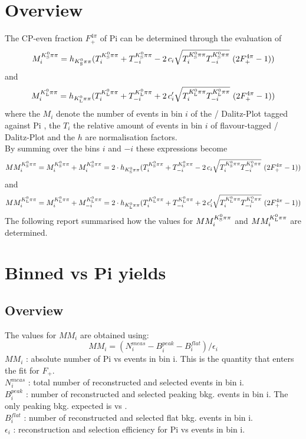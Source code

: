 \chapter{Overview}
The CP-even fraction $F_+^{4\pi}$ of \4Pi can be determined through the evaluation of
\begin{equation}
M^{{K^0_{\rm\scriptscriptstyle S}}{\pi}\pi}_i = h_{{K^0_{\rm\scriptscriptstyle S}}{\pi}\pi} (T^{{K^0_{\rm\scriptscriptstyle S}}{\pi}\pi}_i + T^{{K^0_{\rm\scriptscriptstyle S}}{\pi}\pi}_{-i} - 2 \, c_i  \sqrt{T^{{K^0_{\rm\scriptscriptstyle S}}{\pi}\pi}_i T^{{K^0_{\rm\scriptscriptstyle S}}{\pi}\pi}_{-i}} \ (2 F_+^{4\pi} -1))
\end{equation}
and
\begin{equation}
M^{{K^0_{\rm\scriptscriptstyle L}}{\pi}\pi}_i =  h_{{K^0_{\rm\scriptscriptstyle L}}{\pi}\pi} (T^{{K^0_{\rm\scriptscriptstyle L}}{\pi}\pi}_i + T^{{K^0_{\rm\scriptscriptstyle L}}{\pi}\pi}_{-i} + 2 \, c'_i  \sqrt{T^{{K^0_{\rm\scriptscriptstyle L}}{\pi}\pi}_i T^{{K^0_{\rm\scriptscriptstyle L}}{\pi}\pi}_{-i}} \ (2 F_+^{4\pi} -1))
\end{equation}
where the $M_i$ denote the number of events in bin $i$ of the \KsPiPi / \KlPiPi Dalitz-Plot tagged against \4Pi , the $T_i$ the relative amount of events in bin $i$ of flavour-tagged \KsPiPi / \KlPiPi Dalitz-Plot and the $h$ are normalisation factors.\\
By summing over the bins $i$ and $-i$ these expressions become
\begin{equation}
MM^{{K^0_{\rm\scriptscriptstyle S}}{\pi}\pi}_i = M^{{K^0_{\rm\scriptscriptstyle S}}{\pi}\pi}_i + M^{{K^0_{\rm\scriptscriptstyle S}}{\pi}\pi}_{i} =2\cdot h_{{K^0_{\rm\scriptscriptstyle S}}{\pi}\pi} (T^{{K^0_{\rm\scriptscriptstyle S}}{\pi}\pi}_i + T^{{K^0_{\rm\scriptscriptstyle S}}{\pi}\pi}_{-i} - 2 \, c_i  \sqrt{T^{{K^0_{\rm\scriptscriptstyle S}}{\pi}\pi}_i T^{{K^0_{\rm\scriptscriptstyle S}}{\pi}\pi}_{-i}} \ (2 F_+^{4\pi} -1))
\end{equation}
and
\begin{equation}
MM^{{K^0_{\rm\scriptscriptstyle L}}{\pi}\pi}_i = M^{{K^0_{\rm\scriptscriptstyle L}}{\pi}\pi}_i + M^{{K^0_{\rm\scriptscriptstyle L}}{\pi}\pi}_{-i} = 2\cdot h_{{K^0_{\rm\scriptscriptstyle L}}{\pi}\pi} (T^{{K^0_{\rm\scriptscriptstyle L}}{\pi}\pi}_i + T^{{K^0_{\rm\scriptscriptstyle L}}{\pi}\pi}_{-i} + 2 \, c'_i  \sqrt{T^{{K^0_{\rm\scriptscriptstyle L}}{\pi}\pi}_i T^{{K^0_{\rm\scriptscriptstyle L}}{\pi}\pi}_{-i}} \ (2 F_+^{4\pi} -1))
\end{equation}
The following report summarised how the values for $MM^{{K^0_{\rm\scriptscriptstyle S}}{\pi}\pi}_i$ and $MM^{{K^0_{\rm\scriptscriptstyle L}}{\pi}\pi}_i$ are determined.\\


\chapter{Binned \KsPiPi vs \4Pi yields}

\section{Overview}
The values for $MM_i$ are obtained using:
\begin{equation}
MM_i = (N_i^{meas} - B_i^{peak} - B_i^{flat})/ \epsilon_i
\end{equation}
$MM_i$ : absolute number of \4Pi vs \KsPiPi events in bin i. This is the quantity that enters the fit for $F_+$.\\
$N_i^{meas}$ : total number of reconstructed and selected events in bin i. \\
$B_i^{peak}$ : number of reconstructed and selected peaking bkg. events in bin i. The only peaking bkg. expected is \KsPiPi vs \KsPiPi. \\
$B_i^{flat}$ : number of reconstructed and selected flat bkg. events in bin i.\\
$\epsilon_i$ : reconstruction and selection efficiency for \4Pi vs \KsPiPi events in bin i. \\



